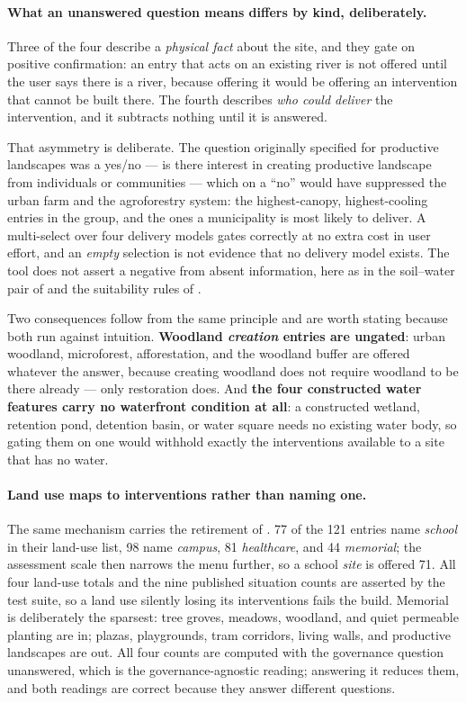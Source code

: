 \paragraph{What an unanswered question means differs by kind, deliberately.}
Three of the four describe a \emph{physical fact} about the site, and they gate
on positive confirmation: an entry that acts on an existing river is not
offered until the user says there is a river, because offering it would be
offering an intervention that cannot be built there. The fourth describes
\emph{who could deliver} the intervention, and it subtracts nothing until it is
answered.

That asymmetry is deliberate. The question originally specified for productive
landscapes was a yes/no --- is there interest in creating productive landscape
from individuals or communities --- which on a ``no'' would have suppressed the
urban farm and the agroforestry system: the highest-canopy, highest-cooling
entries in the group, and the ones a municipality is most likely to deliver. A
multi-select over four delivery models gates correctly at no extra cost in user
effort, and an \emph{empty} selection is not evidence that no delivery model
exists. The tool does not assert a negative from absent information, here as in
the soil--water pair of  and the suitability rules of
.

Two consequences follow from the same principle and are worth stating because
both run against intuition. \textbf{Woodland \emph{creation} entries are
ungated}: urban woodland, microforest, afforestation, and the woodland buffer
are offered whatever the answer, because creating woodland does not require
woodland to be there already --- only restoration does. And \textbf{the four
constructed water features carry no waterfront condition at all}: a constructed
wetland, retention pond, detention basin, or water square needs no existing
water body, so gating them on one would withhold exactly the interventions
available to a site that has no water.

\paragraph{Land use maps to interventions rather than naming one.} The same
mechanism carries the retirement of . \num{77} of the
\num{121} entries name \emph{school} in their land-use list, \num{98} name
\emph{campus}, \num{81} \emph{healthcare}, and \num{44} \emph{memorial};
the assessment scale then narrows the menu further, so a school \emph{site}
is offered \num{71}. All four land-use totals and the nine published
situation counts are asserted by the test suite, so a land use silently losing
its interventions fails the build. Memorial is deliberately the sparsest: tree groves, meadows, woodland,
and quiet permeable planting are in; plazas, playgrounds, tram corridors,
living walls, and productive landscapes are out. All four counts are computed
with the governance question unanswered, which is the governance-agnostic
reading; answering it reduces them, and both readings are correct because they
answer different questions.

